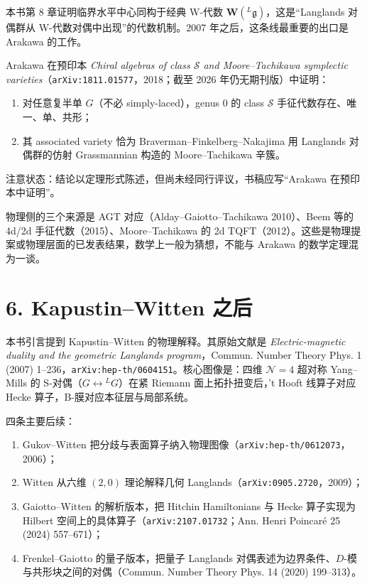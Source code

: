 本书第 8 章证明临界水平中心同构于经典 W-代数 $\mathbf W({}^L\mathfrak{g})$，这是“Langlands 对偶群从 W-代数对偶中出现”的代数机制。2007 年之后，这条线最重要的出口是 Arakawa 的工作。

Arakawa 在预印本 \emph{Chiral algebras of class $\mathcal S$ and Moore--Tachikawa symplectic varieties}（\texttt{arXiv:1811.01577}，2018；截至 2026 年仍无期刊版）中证明：
\begin{enumerate}
\item 对任意复半单 $G$（不必 simply-laced），genus $0$ 的 class $\mathcal S$ 手征代数存在、唯一、单、共形；
\item 其 associated variety 恰为 Braverman--Finkelberg--Nakajima 用 Langlands 对偶群的仿射 Grassmannian 构造的 Moore--Tachikawa 辛簇。
\end{enumerate}
注意状态：结论以定理形式陈述，但尚未经同行评议，书稿应写“Arakawa 在预印本中证明”。

物理侧的三个来源是 AGT 对应（Alday--Gaiotto--Tachikawa 2010）、Beem 等的 4d/2d 手征代数（2015）、Moore--Tachikawa 的 2d TQFT（2012）。这些是物理提案或物理层面的已发表结果，数学上一般为猜想，不能与 Arakawa 的数学定理混为一谈。

\section*{6. Kapustin--Witten 之后}

本书引言提到 Kapustin--Witten 的物理解释。其原始文献是 \emph{Electric-magnetic duality and the geometric Langlands program}，Commun. Number Theory Phys. 1 (2007) 1--236，\texttt{arXiv:hep-th/0604151}。核心图像是：四维 $\mathcal N=4$ 超对称 Yang--Mills 的 S-对偶（$G\leftrightarrow{}^L G$）在紧 Riemann 面上拓扑扭变后，'t Hooft 线算子对应 Hecke 算子，B-膜对应本征层与局部系统。

四条主要后续：
\begin{enumerate}
\item Gukov--Witten 把分歧与表面算子纳入物理图像（\texttt{arXiv:hep-th/0612073}，2006）；
\item Witten 从六维 $(2,0)$ 理论解释几何 Langlands（\texttt{arXiv:0905.2720}，2009）；
\item Gaiotto--Witten 的解析版本，把 Hitchin Hamiltonians 与 Hecke 算子实现为 Hilbert 空间上的具体算子（\texttt{arXiv:2107.01732}；Ann. Henri Poincar\'e 25 (2024) 557--671）；
\item Frenkel--Gaiotto 的量子版本，把量子 Langlands 对偶表述为边界条件、$D$-模与共形块之间的对偶（Commun. Number Theory Phys. 14 (2020) 199--313）。
\end{enumerate}

